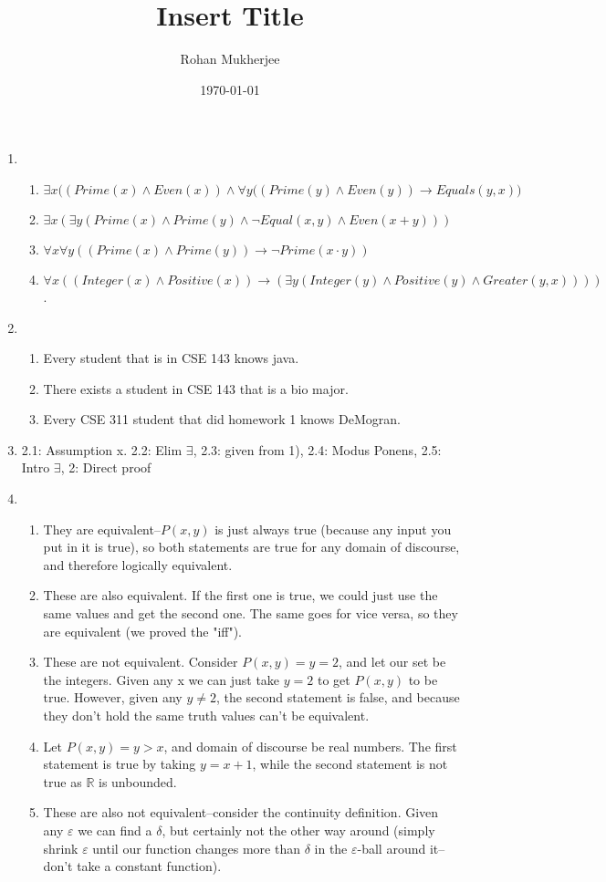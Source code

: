 \documentclass[12pt]{article}
\title{Insert Title}
\date{\today}
\author{Rohan Mukherjee}
\def\mbb#1{\mathbb{#1}}
\def\bR{\mbb{R}}
\theoremstyle{definition}
\theoremstyle{remark}
\newcommand{\ve}{\varepsilon}
\newcommand{\ra}{\rightarrow}
\begin{document}
	\maketitle
	\begin{enumerate}[leftmargin=\labelsep]
		\item 
		\begin{enumerate}
			\item $\exists x \big((Prime(x) \land Even(x)) \land \forall y ((Prime(y) \land Even(y)) \ra Equals(y, x)\big)$
			\item $\exists x (\exists y (Prime(x) \land Prime(y) \land \lnot Equal(x, y) \land Even(x+y)))$
			\item $\forall x \forall y ((Prime(x) \land Prime(y)) \ra \lnot Prime(x \cdot y))$
			\item $\forall x ((Integer(x) \land Positive(x)) \ra (\exists y(Integer(y) \land Positive(y) \land Greater(y, x))))$.
		\end{enumerate}
		\item \begin{enumerate}
			\item Every student that is in CSE 143 knows java.
			\item There exists a student in CSE 143 that is a bio major.
			\item Every CSE 311 student that did homework 1 knows DeMogran.
		\end{enumerate}
		\item 
		2.1: Assumption x. 2.2: Elim $\exists$, 2.3: given from 1), 2.4: Modus Ponens, 2.5: Intro $\exists$, 2: Direct proof
		
		\item 
		\begin{enumerate}
			\item They are equivalent--$P(x, y)$ is just always true (because any input you put in it is true), so both statements are true for any domain of discourse, and therefore logically equivalent.
			\item These are also equivalent. If the first one is true, we could just use the same values and get the second one. The same goes for vice versa, so they are equivalent (we proved the "iff").
			\item These are not equivalent. Consider $P(x, y) = y = 2$, and let our set be the integers. Given any x we can just take $y = 2$ to get $P(x, y)$ to be true. However, given any $y \neq 2$, the second statement is false, and because they don't hold the same truth values can't be equivalent.
			\item Let $P(x, y) = y > x$, and domain of discourse be real numbers. The first statement is true by taking $y = x+1$, while the second statement is not true as $\bR$ is unbounded.
			\item These are also not equivalent--consider the continuity definition. Given any $\ve$ we can find a $\delta$, but certainly not the other way around (simply shrink $\ve$ until our function changes more than $\delta$ in the $\ve$-ball around it--don't take a constant function).
		\end{enumerate}
		

\end{enumerate}
\end{document}

